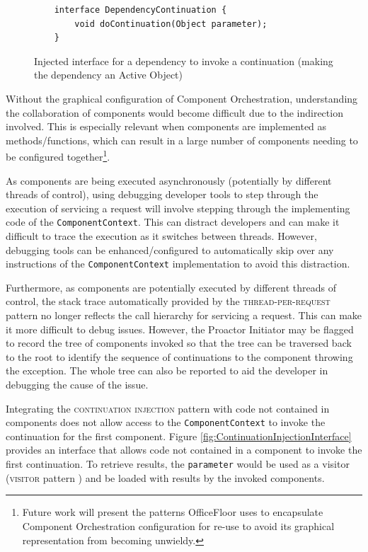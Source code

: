 \documentclass[prodmode]{style/acmlarge}
\begin{document}
\begin{figure}[tp]
\begin{verbatim}
    interface DependencyContinuation {
        void doContinuation(Object parameter);
    }
\end{verbatim}
\caption{Injected interface for a dependency to invoke a continuation (making the dependency an Active Object)}
\label{fig:DC_interface}
\end{figure}

Without the graphical configuration of Component Orchestration, understanding
the collaboration of components would become difficult due to the indirection
involved.  This is especially relevant when components are implemented as
methods/functions, which can result in a large number of components needing to
be configured together\footnote{Future work will present the patterns
OfficeFloor \cite{officefloor} uses to encapsulate Component Orchestration
configuration for re-use to avoid its graphical representation from becoming
unwieldy.}.

As components are being executed asynchronously (potentially by different
threads of control), using debugging developer tools to step through the
execution of servicing a request will involve stepping through the implementing
code of the \texttt{ComponentContext}.  This can distract developers and can
make it difficult to trace the execution as it switches between threads. 
However, debugging tools can be enhanced/configured to automatically skip over any
instructions of the \texttt{ComponentContext} implementation to avoid this
distraction.

Furthermore, as components are potentially executed by different threads of
control, the stack trace automatically provided by the
\textsc{thread-per-request} pattern no longer reflects the call hierarchy for
servicing a request.  This can make it more difficult to debug issues.  However,
the Proactor Initiator may be flagged to record the tree of components invoked
so that the tree can be traversed back to the root to identify the sequence of
continuations to the component throwing the exception.  The whole tree can also
be reported to aid the developer in debugging the cause of the issue.

Integrating the \textsc{continuation injection} pattern with code not contained in
components does not allow access to the \texttt{ComponentContext} to invoke the
continuation for the first component.  Figure
\ref{fig:ContinuationInjectionInterface} provides an interface that allows code
not contained in a component to invoke the first continuation.  To retrieve
results, the \texttt{parameter} would be used as a visitor (\textsc{visitor}
pattern \cite{gof}) and be loaded with results by the invoked components.
\end{document}
